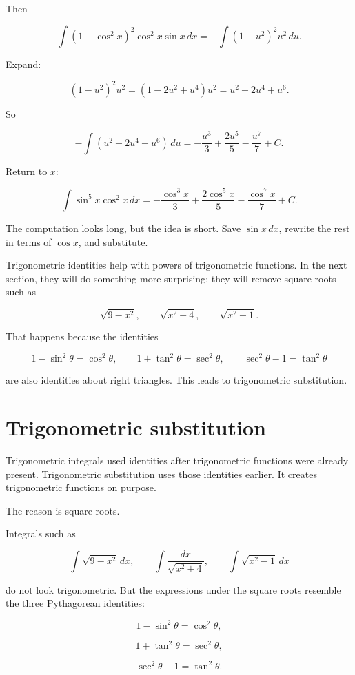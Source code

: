 Then

\[
\int (1-\cos^2 x)^2\cos^2 x\sin x\,dx
=
-\int (1-u^2)^2u^2\,du.
\]

Expand:

\[
(1-u^2)^2u^2=(1-2u^2+u^4)u^2=u^2-2u^4+u^6.
\]

So

\[
-\int (u^2-2u^4+u^6)\,du
=
-\frac{u^3}{3}+\frac{2u^5}{5}-\frac{u^7}{7}+C.
\]

Return to \(x\):

\[
\boxed{
\int \sin^5 x\cos^2 x\,dx
=
-\frac{\cos^3 x}{3}
+\frac{2\cos^5 x}{5}
-\frac{\cos^7 x}{7}
+C.
}
\]

The computation looks long, but the idea is short.  Save \(\sin x\,dx\), rewrite the
rest in terms of \(\cos x\), and substitute.

Trigonometric identities help with powers of trigonometric functions.  In the next
section, they will do something more surprising: they will remove square roots such as

\[
\sqrt{9-x^2},
\qquad
\sqrt{x^2+4},
\qquad
\sqrt{x^2-1}.
\]

That happens because the identities

\[
1-\sin^2\theta=\cos^2\theta,
\qquad
1+\tan^2\theta=\sec^2\theta,
\qquad
\sec^2\theta-1=\tan^2\theta
\]

are also identities about right triangles.  This leads to trigonometric substitution.
\section{Trigonometric substitution}
\label{sec:trigonometric-substitution}

Trigonometric integrals used identities after trigonometric functions were already
present.  Trigonometric substitution uses those identities earlier.  It creates
trigonometric functions on purpose.

The reason is square roots.

Integrals such as

\[
\int \sqrt{9-x^2}\,dx,
\qquad
\int \frac{dx}{\sqrt{x^2+4}},
\qquad
\int \sqrt{x^2-1}\,dx
\]

do not look trigonometric.  But the expressions under the square roots resemble the
three Pythagorean identities:

\[
1-\sin^2\theta=\cos^2\theta,
\]

\[
1+\tan^2\theta=\sec^2\theta,
\]

\[
\sec^2\theta-1=\tan^2\theta.
\]

